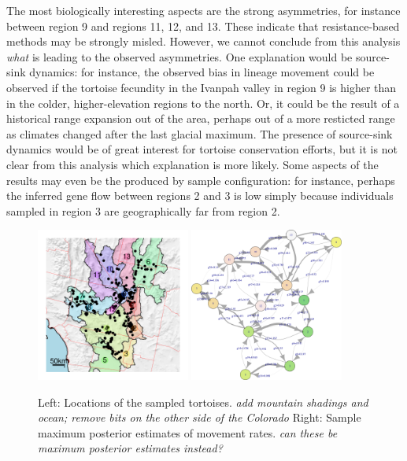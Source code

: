 \documentclass{article}
\newcommand{\plr}[1]{{\em \color{blue} #1}}
\begin{document}
The most biologically interesting aspects
are the strong asymmetries, for instance between region 9 and regions 11, 12, and 13.
These indicate that resistance-based methods may be strongly misled.
However, we cannot conclude from this analysis \emph{what} is leading to the observed asymmetries.
One explanation would be source-sink dynamics:
for instance, the observed bias in lineage movement could be observed 
if the tortoise fecundity in the Ivanpah valley in region 9
is higher than in the colder, higher-elevation regions to the north.
Or, it could be the result of a historical range expansion out of the area,
perhaps out of a more resticted range as climates changed after the last glacial maximum.
The presence of source-sink dynamics would be of great interest for tortoise conservation efforts,
but it is not clear from this analysis which explanation is more likely.
Some aspects of the results may even be the produced by sample configuration:
for instance, perhaps the inferred gene flow between regions 2 and 3 is low
simply because individuals sampled in region 3 are geographically far from region 2.

\begin{figure}
\centering
 \includegraphics[width=0.45\textwidth]{figs/fancy_watershed_assignments}
 \includegraphics[width=0.45\textwidth]{figs/tort_graph_results}
\caption{Left: Locations of the sampled tortoises.
    \plr{add mountain shadings and ocean; remove bits on the other side of the Colorado}
    Right: Sample maximum posterior estimates 
    of movement rates.
    \plr{can these be maximum posterior estimates instead?}
    } \label{fig:tort_land}
\end{figure}
\end{document}

